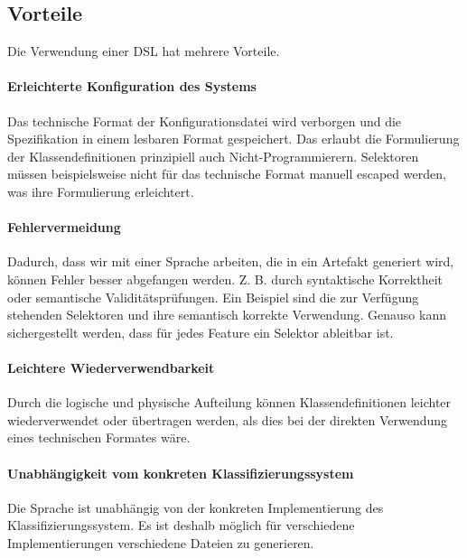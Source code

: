     \subsection{Vorteile}
        Die Verwendung einer DSL hat mehrere Vorteile.

        \paragraph{Erleichterte Konfiguration des Systems}
        Das technische Format der Konfigurationsdatei wird verborgen
        und die Spezifikation in einem lesbaren Format gespeichert.
        Das erlaubt die Formulierung der Klassendefinitionen prinzipiell auch
        Nicht-Programmierern.
        Selektoren müssen beispielsweise nicht für das technische Format manuell escaped werden,
        was ihre Formulierung erleichtert.

        \paragraph{Fehlervermeidung}
        Dadurch, dass wir mit einer Sprache arbeiten, die in ein Artefakt generiert wird,
        können Fehler besser abgefangen werden.
        Z. B. durch syntaktische Korrektheit oder semantische Validitätsprüfungen.
        Ein Beispiel sind die zur Verfügung stehenden Selektoren und ihre semantisch korrekte Verwendung.
        Genauso kann sichergestellt werden, dass für jedes Feature ein Selektor ableitbar ist.

        \paragraph{Leichtere Wiederverwendbarkeit}
        Durch die logische und physische Aufteilung können Klassendefinitionen leichter
        wiederverwendet oder übertragen werden, als dies bei der direkten Verwendung eines
        technischen Formates wäre.

        \paragraph{Unabhängigkeit vom konkreten Klassifizierungssystem}
        Die Sprache ist unabhängig von der konkreten Implementierung des Klassifizierungssystem.
        Es ist deshalb möglich für verschiedene Implementierungen verschiedene Dateien zu generieren.
